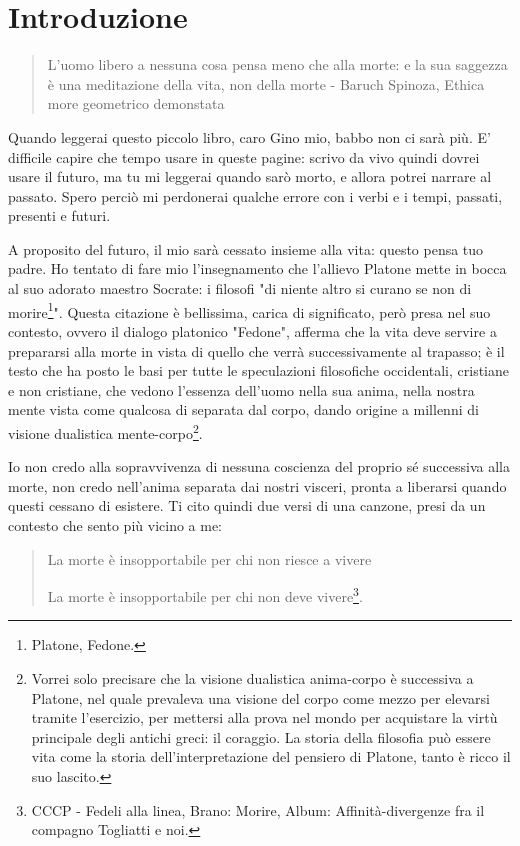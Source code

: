 \chapter*{Introduzione}

\begin{quotation}
	\small L'uomo libero a nessuna cosa pensa meno che alla morte: e la sua saggezza è una meditazione della vita, non della morte - Baruch Spinoza, Ethica more geometrico demonstata
\end{quotation}

Quando leggerai questo piccolo libro, caro Gino mio, babbo non ci sarà più. E' difficile capire che tempo usare in queste pagine: scrivo da vivo quindi dovrei usare il futuro, ma tu mi leggerai quando sarò morto, e allora potrei narrare al passato. Spero perciò mi perdonerai qualche errore con i verbi e i tempi, passati, presenti e futuri.

A proposito del futuro, il mio sarà cessato insieme alla vita: questo pensa tuo padre. Ho tentato di fare mio l'insegnamento che l'allievo Platone mette in bocca al suo adorato maestro Socrate: i filosofi "di niente altro si curano se non di morire\footnote{Platone, Fedone.}". Questa citazione è bellissima, carica di significato, però presa nel suo contesto, ovvero il dialogo platonico "Fedone", afferma che la vita deve servire a prepararsi alla morte in vista di quello che verrà successivamente al trapasso; è il testo che ha posto le basi per tutte le speculazioni filosofiche occidentali, cristiane e non cristiane, che vedono l'essenza dell'uomo nella sua anima, nella nostra mente vista come qualcosa di separata dal corpo, dando origine a millenni di visione dualistica mente-corpo\footnote{Vorrei solo precisare che la visione dualistica anima-corpo è successiva a Platone, nel quale prevaleva una visione del corpo come mezzo per elevarsi tramite l'esercizio, per mettersi alla prova nel mondo per acquistare la virtù principale degli antichi greci: il coraggio. La storia della filosofia può essere vita come la storia dell'interpretazione del pensiero di Platone, tanto è ricco il suo lascito.}. 

Io non credo alla sopravvivenza di nessuna coscienza del proprio sé successiva alla morte, non credo nell'anima separata dai nostri visceri, pronta a liberarsi quando questi cessano di esistere. Ti cito quindi due versi di una canzone, presi da un contesto che sento più vicino a me:

\begin{quotation}
	\small La morte è insopportabile per chi non riesce a vivere
	
	La morte è insopportabile per chi non deve vivere\footnote{CCCP - Fedeli alla linea, Brano: Morire, Album: Affinità-divergenze fra il compagno Togliatti e noi. }.
\end{quotation}

